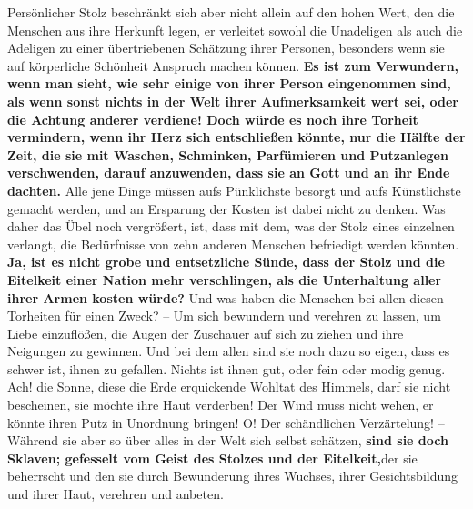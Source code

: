 Persönlicher Stolz beschränkt sich aber nicht allein auf den hohen Wert, den
die Menschen aus ihre Herkunft legen, er verleitet sowohl die Unadeligen als
auch
die Adeligen zu einer übertriebenen Schätzung ihrer Personen, besonders wenn sie
auf körperliche Schönheit Anspruch machen können.
\label{ref:11_09_putzsucht}
\textbf{Es ist zum Verwundern, wenn man
sieht, wie sehr einige von ihrer Person eingenommen sind, als wenn sonst nichts
in der Welt ihrer Aufmerksamkeit wert sei, oder die Achtung anderer verdiene!
Doch würde es noch ihre Torheit vermindern, wenn ihr Herz sich entschließen
könnte, nur die Hälfte der Zeit, die sie mit Waschen,
Schminken, Parfümieren und
Putzanlegen verschwenden, darauf anzuwenden, dass sie an Gott und an ihr Ende
dachten.} Alle jene Dinge müssen aufs Pünklichste besorgt und aufs Künstlichste
gemacht werden, und an Ersparung der Kosten ist dabei nicht zu denken. Was daher
das Übel noch vergrößert, ist, dass mit dem, was der Stolz eines einzelnen
verlangt, die Bedürfnisse von zehn anderen Menschen befriedigt werden könnten.
\textbf{Ja, ist es nicht grobe und entsetzliche Sünde, dass der
Stolz und die Eitelkeit
einer Nation mehr verschlingen, als die Unterhaltung aller ihrer Armen kosten
würde?} Und was haben die Menschen bei allen diesen Torheiten für einen Zweck?
-- Um sich bewundern und verehren zu lassen, um Liebe einzuflößen, die Augen der
Zuschauer auf sich zu ziehen und ihre Neigungen zu gewinnen. Und bei dem allen
sind sie noch dazu so eigen, dass es schwer ist, ihnen zu gefallen. Nichts ist
ihnen gut, oder fein oder modig genug. Ach! die Sonne, diese
die Erde
erquickende Wohltat des Himmels, darf sie nicht bescheinen, sie möchte ihre
Haut verderben! Der Wind muss nicht wehen, er könnte ihren Putz in Unordnung
bringen! O! Der schändlichen Verzärtelung! -- Während sie aber so über alles in
der Welt sich selbst schätzen, \textbf{sind sie doch
Sklaven;
gefesselt vom Geist des
Stolzes und der Eitelkeit,}der sie beherrscht und den sie durch Bewunderung
ihres Wuchses, ihrer Gesichtsbildung und ihrer Haut, verehren und anbeten.

